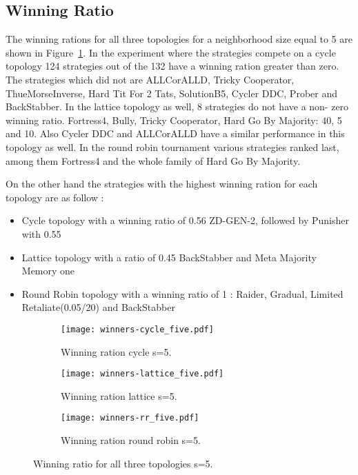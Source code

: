 \subsection{Winning Ratio}
\label{sub:winning-ratio}

The winning rations for all three topologies for a neighborhood size equal to
5 are shown in Figure~\ref{fig:winning-five}. In the experiment where the
strategies compete on a cycle topology 124 strategies out of the 132 have a
winning ration greater than zero. The strategies which did not are ALLCorALLD,
Tricky Cooperator, ThueMorseInverse, Hard Tit For 2 Tats,	SolutionB5, Cycler DDC,
Prober and BackStabber.
In the lattice topology as well, 8 strategies do not have a non- zero winning ratio.
Fortress4, Bully, Tricky Cooperator, Hard Go By Majority: 40, 5 and 10.
Also Cycler DDC and ALLCorALLD have a similar performance in this topology as well.
In the round robin tournament various strategies
ranked last, among them Fortress4 and the whole family of Hard Go By Majority.

On the other hand the strategies with the highest winning ration for each
topology are as follow :
\begin{itemize}
  \item Cycle topology with a winning ratio of 0.56 ZD-GEN-2, followed by Punisher
        with 0.55
  \item Lattice topology with a ratio of 0.45 BackStabber and Meta Majority
        Memory one
  \item Round Robin topology with a winning ratio of 1 : Raider, Gradual, Limited
        Retaliate(0.05/20) and BackStabber
\end{itemize}

\begin{figure}[H]
\centering
    \begin{subfigure}[t]{1\textwidth}
    \centering
        \texttt{[image: winners-cycle\_five.pdf]}
    \caption{Winning ration cycle s=5.}
    \end{subfigure}
\hfill
    \begin{subfigure}[t]{1\textwidth}\centering
    \centering
        \texttt{[image: winners-lattice\_five.pdf]}
    \caption{Winning ration lattice s=5.}
    \end{subfigure}
\hfill
    \begin{subfigure}[t]{1\textwidth}\centering
    \centering
        \texttt{[image: winners-rr\_five.pdf]}
    \caption{Winning ration round robin s=5.}
    \end{subfigure}
\caption{Winning ratio for all three topologies s=5.}
\label{fig:winning-five}
\end{figure}

